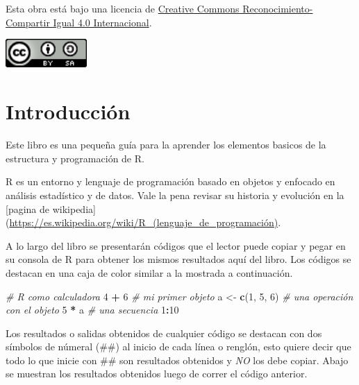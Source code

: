 \documentclass[
]{book}
\newenvironment{Shaded}{\begin{snugshade}}{\end{snugshade}}
\newcommand{\CommentTok}[1]{\textcolor[rgb]{0.56,0.35,0.01}{\textit{#1}}}
\newcommand{\DecValTok}[1]{\textcolor[rgb]{0.00,0.00,0.81}{#1}}
\newcommand{\KeywordTok}[1]{\textcolor[rgb]{0.13,0.29,0.53}{\textbf{#1}}}
\newcommand{\NormalTok}[1]{#1}
\newcommand{\OperatorTok}[1]{\textcolor[rgb]{0.81,0.36,0.00}{\textbf{#1}}}
\newcommand{\StringTok}[1]{\textcolor[rgb]{0.31,0.60,0.02}{#1}}
\begin{document}
Esta obra está bajo una licencia de \href{https://creativecommons.org/licenses/by-sa/4.0/deed.es}{Creative Commons Reconocimiento-Compartir Igual 4.0 Internacional}.

\begin{flushleft}\includegraphics[width=1.22in]{images/by-sa-88x31} \end{flushleft}

\hypertarget{intro}{%
\chapter{Introducción}\label{intro}}

Este libro es una pequeña guía para la aprender los elementos basicos de la estructura y programación de R.

R es un entorno y lenguaje de programación basado en objetos y enfocado en análisis estadístico y de datos. Vale la pena revisar su historia y evolución en la {[}pagina de wikipedia{]}(\url{https://es.wikipedia.org/wiki/R_(lenguaje_de_programación)}.

A lo largo del libro se presentarán códigos que el lector puede copiar y pegar en su consola de R para obtener los mismos resultados aquí del libro. Los códigos se destacan en una caja de color similar a la mostrada a continuación.

\begin{Shaded}
\begin{Highlighting}[]
\CommentTok{# R como calculadora}
\DecValTok{4} \OperatorTok{+}\StringTok{ }\DecValTok{6} 
\CommentTok{# mi primer objeto}
\NormalTok{a <-}\StringTok{ }\KeywordTok{c}\NormalTok{(}\DecValTok{1}\NormalTok{, }\DecValTok{5}\NormalTok{, }\DecValTok{6}\NormalTok{)}
\CommentTok{# una operación con el objeto}
\DecValTok{5} \OperatorTok{*}\StringTok{ }\NormalTok{a}
\CommentTok{# una secuencia}
\DecValTok{1}\OperatorTok{:}\DecValTok{10}
\end{Highlighting}
\end{Shaded}

Los resultados o salidas obtenidos de cualquier código se destacan con dos símbolos de númeral (\#\#) al inicio de cada línea o renglón, esto quiere decir que todo lo que inicie con \#\# son resultados obtenidos y \emph{NO} los debe copiar. Abajo se muestran los resultados obtenidos luego de correr el código anterior.
\end{document}
